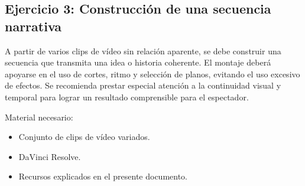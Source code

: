 \subsection{Ejercicio 3: Construcción de una secuencia narrativa}
A partir de varios clips de vídeo sin relación aparente, se debe construir una secuencia que transmita una idea o historia coherente. 
El montaje deberá apoyarse en el uso de cortes, ritmo y selección de planos, evitando el uso excesivo de efectos. 
Se recomienda prestar especial atención a la continuidad visual y temporal para lograr un resultado comprensible para el espectador.

Material necesario:
\begin{itemize}
    \item Conjunto de clips de vídeo variados.
    \item DaVinci Resolve.
    \item Recursos explicados en el presente documento. 
\end{itemize}

